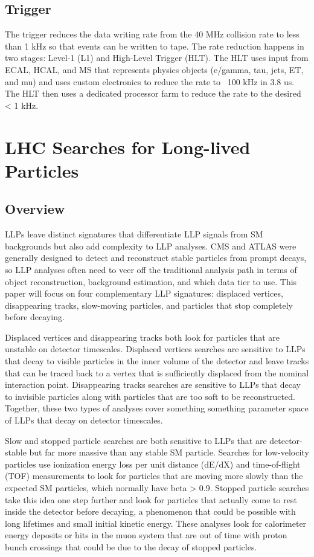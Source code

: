 \documentclass[12pt]{article}
\begin{document}
\subsection{Trigger}
        The trigger reduces the data writing rate from the 40 MHz collision rate to less than 1 kHz so that events can be written to tape. The rate reduction happens in two stages: Level-1 (L1) and High-Level Trigger (HLT). The HLT uses input from ECAL, HCAL, and MS that represents physics objects (e/gamma, tau, jets, ET, and mu) and uses custom electronics to reduce the rate to ~100 kHz in 3.8 us. The HLT then uses a dedicated processor farm to reduce the rate to the desired < 1 kHz.

\section{LHC Searches for Long-lived Particles}
\subsection{Overview}
        LLPs leave distinct signatures that differentiate LLP signals from SM backgrounds but also add complexity to LLP analyses. CMS and ATLAS were generally designed to detect and reconstruct stable particles from prompt decays, so LLP analyses often need to veer off the traditional analysis path in terms of object reconstruction, background estimation, and which data tier to use. This paper will focus on four complementary LLP signatures: displaced vertices, disappearing tracks, slow-moving particles, and particles that stop completely before decaying.

        Displaced vertices and disappearing tracks both look for particles that are unstable on detector timescales. Displaced vertices searches are sensitive to LLPs that decay to visible particles in the inner volume of the detector and leave tracks that can be traced back to a vertex that is sufficiently displaced from the nominal interaction point. Disappearing tracks searches are sensitive to LLPs that decay to invisible particles along with particles that are too soft to be reconstructed. Together, these two types of analyses cover something something parameter space of LLPs that decay on detector timescales.

        Slow and stopped particle searches are both sensitive to LLPs that are detector-stable but far more massive than any stable SM particle. Searches for low-velocity particles use ionization energy loss per unit distance (dE/dX) and time-of-flight (TOF) measurements to look for particles that are moving more slowly than the expected SM particles, which normally have beta > 0.9. Stopped particle searches take this idea one step further and look for particles that actually come to rest inside the detector before decaying, a phenomenon that could be possible with long lifetimes and small initial kinetic energy. These analyses look for calorimeter energy deposits or hits in the muon system that are out of time with proton bunch crossings that could be due to the decay of stopped particles.
\end{document}
